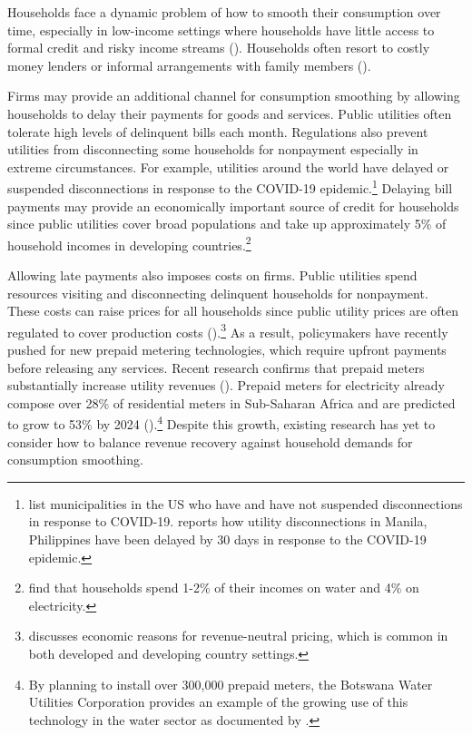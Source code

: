 \documentclass[12pt,table]{article}
\begin{document}
Households face a dynamic problem of how to smooth their consumption over time, especially in low-income settings where households have little access to formal credit and risky income streams (\cite{morduch1995income}).  Households often resort to costly money lenders or informal arrangements with family members (\cite{banerjee2007economic}).  

Firms may provide an additional channel for consumption smoothing by allowing households to delay their payments for goods and services.  Public utilities often tolerate high levels of delinquent bills each month.  Regulations also prevent utilities from disconnecting some households for nonpayment especially in extreme circumstances.  For example, utilities around the world have delayed or suspended disconnections in response to the COVID-19 epidemic.\footnote{\cite{bufordcampbell2020} list municipalities in the US who have and have not suspended disconnections in response to COVID-19.  \cite{domingo2020} reports how utility disconnections in Manila, Philippines have been delayed by 30 days in response to the COVID-19 epidemic.}   Delaying bill payments may provide an economically important source of credit for households since public utilities cover broad populations and take up approximately 5\% of household incomes in developing countries.\footnote{\cite{komives2006distributional} find that households spend 1-2\% of their incomes on water and 4\% on electricity.}

Allowing late payments also imposes costs on firms.  Public utilities spend resources visiting and disconnecting delinquent households for nonpayment.  These costs can raise prices for all households since public utility prices are often regulated to cover production costs (\cite{hoque2013state}).\footnote{\cite{laffont2005regulation} discusses economic reasons for revenue-neutral pricing, which is common in both developed and developing country settings.}  As a result, policymakers have recently pushed for new prepaid metering technologies, which require upfront payments before releasing any services.  Recent research confirms that prepaid meters substantially increase utility revenues (\cite{jack2020charging}).  Prepaid meters for electricity already compose over 28\% of residential meters in Sub-Saharan Africa and are predicted to grow to 53\% by 2024 (\cite{northeast2014}).\footnote{By planning to install over 300,000 prepaid meters, the Botswana Water Utilities Corporation provides an example of the growing use of this technology in the water sector as documented by \cite{heymans2014limits}.}  Despite this growth, existing research has yet to consider how to balance revenue recovery against household demands for consumption smoothing.
\end{document}

